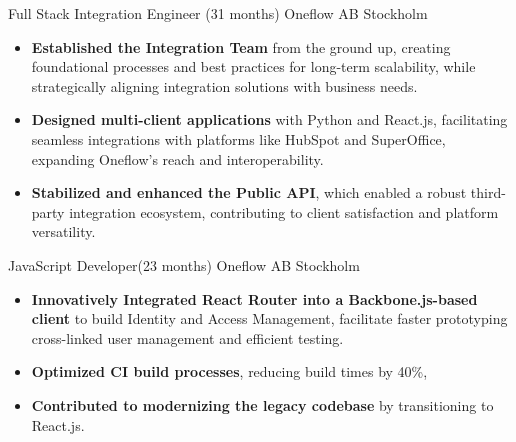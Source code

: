 {Full Stack Integration Engineer (31 months)}
{Oneflow AB}
{Stockholm \Large{}}{}
{
  \begin{itemize}[itemsep=0.07pt, topsep=0.5pt]
    \item \textbf{Established the Integration Team} from the ground up, creating foundational processes and best practices for long-term scalability, while strategically aligning integration solutions with business needs.
    \item \textbf{Designed multi-client applications} with Python and React.js, facilitating seamless integrations with platforms like HubSpot and SuperOffice, expanding Oneflow’s reach and interoperability.
    \item \textbf{Stabilized and enhanced the Public API}, which enabled a robust third-party integration ecosystem, contributing to client satisfaction and platform versatility.
  \end{itemize}
}
{JavaScript Developer(23 months)}
{Oneflow AB}
{Stockholm \Large{}}{}
{
  \begin{itemize}[itemsep=0.07pt, topsep=0.5pt]
    \item \textbf{Innovatively Integrated React Router into a Backbone.js-based client} to build Identity and Access Management, facilitate faster prototyping cross-linked user management and efficient testing.
    \item \textbf{Optimized CI build processes}, reducing build times by 40\%,
    \item \textbf{Contributed to modernizing the legacy codebase} by transitioning to React.js.
  \end{itemize}
}

